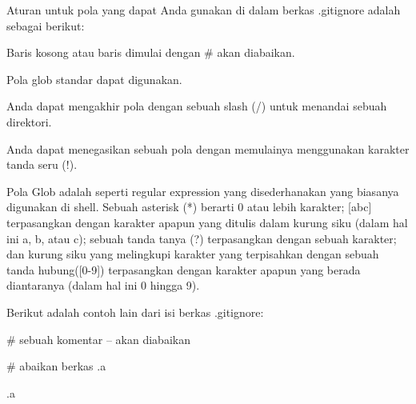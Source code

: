 \noindent 
{\fontsize{14pt}{14pt}\selectfont Aturan untuk pola yang dapat Anda gunakan di dalam berkas .gitignore adalah sebagai berikut: \\} \par
\vspace{14pt}
\noindent 
{\fontsize{14pt}{14pt}\selectfont Baris kosong atau baris dimulai dengan  $  \#  $ akan diabaikan. \\} \par
\vspace{14pt}
\noindent 
{\fontsize{14pt}{14pt}\selectfont Pola glob standar dapat digunakan. \\} \par
\noindent 
{\fontsize{14pt}{14pt}\selectfont Anda dapat mengakhir pola dengan sebuah slash (/) untuk menandai sebuah direktori. \\} \par
\noindent 
{\fontsize{14pt}{14pt}\selectfont Anda dapat menegasikan sebuah pola dengan memulainya menggunakan karakter tanda seru (!). \\} \par
\vspace{14pt}
\noindent 
{\fontsize{14pt}{14pt}\selectfont Pola Glob adalah seperti regular expression yang disederhanakan yang biasanya digunakan di shell. Sebuah asterisk (*) berarti 0 atau lebih karakter; $  $[abc] $  $terpasangkan dengan karakter apapun yang ditulis dalam kurung siku (dalam hal ini a, b, atau c); sebuah tanda tanya (?) terpasangkan dengan sebuah karakter; dan kurung siku yang melingkupi karakter yang terpisahkan dengan sebuah tanda hubung([0-9]) terpasangkan dengan karakter apapun yang berada diantaranya (dalam hal ini 0 hingga 9). \\} \par
\vspace{14pt}
\noindent 
{\fontsize{14pt}{14pt}\selectfont Berikut adalah contoh lain dari isi berkas .gitignore: \\} \par
\vspace{14pt}
\noindent 
{\fontsize{14pt}{14pt}\selectfont  $  \#  $ sebuah komentar – akan diabaikan \\} \par
\noindent 
{\fontsize{14pt}{14pt}\selectfont  $  \#  $ abaikan berkas .a \\} \par
\noindent 
{\fontsize{14pt}{14pt}\selectfont *.a \\} \par
